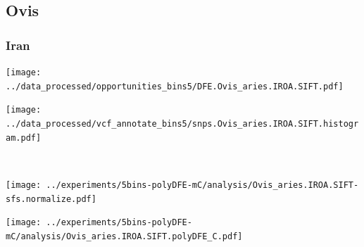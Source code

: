 \subsection{Ovis}

\subsubsection{Iran}

\begin{minipage}{0.49\linewidth}
    \texttt{[image: ../data\_processed/opportunities\_bins5/DFE.Ovis\_aries.IROA.SIFT.pdf]}
\end{minipage}
\begin{minipage}{0.49\linewidth}
    \texttt{[image: ../data\_processed/vcf\_annotate\_bins5/snps.Ovis\_aries.IROA.SIFT.histogram.pdf]}
\end{minipage}
\\
\begin{minipage}{0.49\linewidth}
    \texttt{[image: ../experiments/5bins-polyDFE-mC/analysis/Ovis\_aries.IROA.SIFT-sfs.normalize.pdf]}
\end{minipage}
\begin{minipage}{0.4\linewidth}
    \texttt{[image: ../experiments/5bins-polyDFE-mC/analysis/Ovis\_aries.IROA.SIFT.polyDFE\_C.pdf]}
\end{minipage}
